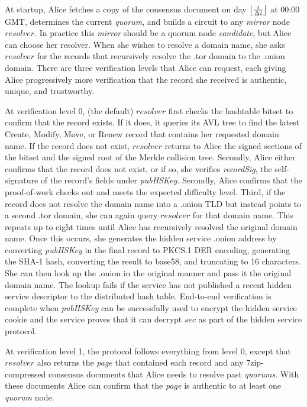 At startup, Alice fetches a copy of the consensus document on day $ \floor[\big]{\frac{i}{\Delta i}} $ at 00:00 GMT, determines the current \emph{quorum}, and builds a circuit to any \emph{mirror} node $ resolver $. In practice this \emph{mirror} should be a quorum node \emph{candidate}, but Alice can choose her resolver. When she wishes to resolve a domain name, she asks $ resolver $ for the records that recursively resolve the .tor domain to the .onion domain. There are three verification levels that Alice can request, each giving Alice progressively more verification that the record she received is authentic, unique, and trustworthy.

At verification level 0, (the default) $ resolver $ first checks the hashtable bitset to confirm that the record exists. If it does, it queries its AVL tree to find the latest Create, Modify, Move, or Renew record that contains her requested domain name. If the record does not exist, $ resolver $ returns to Alice the signed sections of the bitset and the signed root of the Merkle collision tree. Secondly, Alice either confirms that the record does not exist, or if so, she verifies \emph{recordSig}, the self-signature of the record's fields under \emph{pubHSKey}. Secondly, Alice confirms that the proof-of-work checks out and meets the expected difficulty level. Third, if the record does not resolve the domain name into a .onion TLD but instead points to a second .tor domain, she can again query $ resolver $ for that domain name. This repeats up to eight times until Alice has recursively resolved the original domain name. Once this occurs, she generates the hidden service .onion address by converting \emph{pubHSKey} in the final record to PKCS.1 DER encoding, generating the SHA-1 hash, converting the result to base58, and truncating to 16 characters. She can then look up the .onion in the original manner and pass it the original domain name. The lookup fails if the service has not published a recent hidden service descriptor to the distributed hash table. End-to-end verification is complete when \emph{pubHSKey} can be successfully used to encrypt the hidden service cookie and the service proves that it can decrypt $ sec $ as part of the hidden service protocol.

At verification level 1, the protocol follows everything from level 0, except that $ resolver $ also returns the \emph{page} that contained each record and any 7zip-compressed consensus documents that Alice needs to resolve past \emph{quorums}. With these documents Alice can confirm that the \emph{page} is authentic to at least one \emph{quorum} node. 


